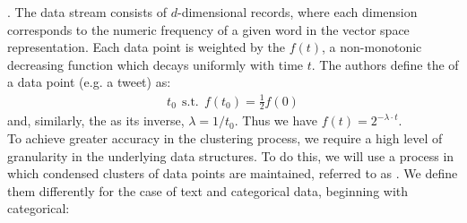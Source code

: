 \documentclass[11pt]{article}
\begin{document}
\myspace
\p {}. The data stream consists of $d$-dimensional records, where each dimension corresponds to the numeric frequency of a given word in the vector space representation. Each data point is weighted by the  $f(t)$, a non-monotonic decreasing function which decays uniformly with time $t$. The authors define the  of a data point (e.g. a tweet) as:
\begin{align}
	t_0 ~~ \text{s.t.} ~~ f(t_0) = \frac{1}{2} f(0)
\end{align}
and, similarly, the  as its inverse, $\lambda = 1/t_0$. Thus we have $f(t) = 2^{-\lambda \cdot t}$. \\

\p To achieve greater accuracy in the clustering process, we require a high level of granularity in the underlying data structures. To do this, we will use a process in which condensed clusters of data points are maintained, referred to as . We define them differently for the case of text and categorical data, beginning with categorical:
\end{document}
